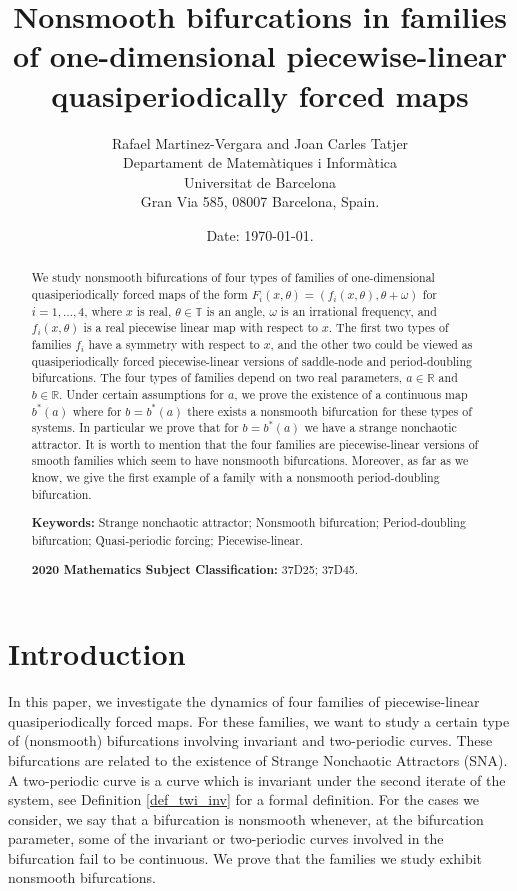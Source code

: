 \documentclass[12pt]{article}
\title{Nonsmooth bifurcations in families of one-dimensional piecewise-linear quasiperiodically forced maps}
\author{ Rafael Martinez-Vergara and Joan Carles Tatjer\\
{\small Departament de Matem\`atiques i Inform\`atica\\
Universitat de Barcelona\\
Gran Via 585, 08007 Barcelona, Spain.}
}
\date{\small Date: \today.}
\newcommand{\T}{\mathbb{T}}
\newcommand{\R}{\mathbb{R}}
\theoremstyle{plain}
\theoremstyle{remark}
\theoremstyle{definition}
\begin{document}
\maketitle

\begin{abstract}
    We study nonsmooth bifurcations of four types of families of one-dimensional quasiperiodically forced maps of the form $F_i(x,\theta) = (f_i(x,\theta), \theta+\omega)$ for $i=1,\dots,4$, where $x$ is real, $\theta\in\T$ is an angle, $\omega$ is an irrational frequency, and $f_i(x,\theta)$ is a real piecewise linear map with respect to $x$. The first two types of families $f_i$ have a symmetry with respect to $x$, and the other two could be viewed as quasiperiodically forced piecewise-linear versions of saddle-node and period-doubling bifurcations. The four types of families depend on two real parameters, $a\in\R$ and $b\in\R$. Under certain assumptions for $a$, we prove the existence of a continuous map $b^*(a)$ where for $b=b^*(a)$ there exists a nonsmooth bifurcation for these types of systems. In particular we prove that for $b=b^*(a)$ we have a strange nonchaotic attractor.
    It is worth to mention that the four families are piecewise-linear versions of smooth families 
    which seem to have nonsmooth bifurcations. Moreover, as far as we know, we give the first example of a family with a nonsmooth period-doubling bifurcation.

    
    \noindent\small\textbf{Keywords:} 
        Strange nonchaotic attractor; Nonsmooth bifurcation; Period-doubling bifurcation; Quasi-periodic forcing; Piecewise-linear.

    \noindent\small\textbf{2020 Mathematics Subject Classification:} 37D25; 37D45.
\end{abstract}


\newpage
\section{Introduction}
In this paper, we investigate the dynamics of four families of piecewise-linear quasiperiodically forced maps. For these families, we want to study a certain type of (nonsmooth) bifurcations involving invariant and two-periodic curves. These bifurcations are related to the existence of Strange Nonchaotic Attractors (SNA). A two-periodic curve is a curve which is invariant under the second iterate of the system, see Definition \ref{def_twi_inv} for a formal definition. For the cases we consider, we say that a bifurcation is nonsmooth whenever, at the bifurcation parameter, some of the invariant or two-periodic curves involved in the bifurcation fail to be continuous. We prove that the families we study exhibit nonsmooth bifurcations.
\end{document}
